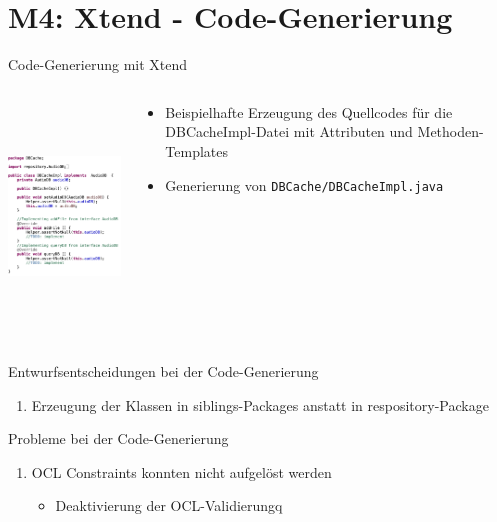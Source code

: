 \section[M4: Xtend]{M4: Xtend - Code-Generierung}
\begin{frame}{Code-Generierung mit Xtend}
	\vspace{-5mm}
	\begin{columns}
		\begin{contentblock}{}
			\includegraphics[height=60mm]{figures/xtend.png}
		\end{contentblock}
		\begin{contentblock}{}
			\begin{itemize}
				\item Beispielhafte Erzeugung des Quellcodes für die DBCacheImpl-Datei mit Attributen und Methoden-Templates
				\item Generierung von \texttt{DBCache/DBCacheImpl.java}
			\end{itemize}
		\end{contentblock}
	\end{columns}
\end{frame}

\begin{frame}{Entwurfsentscheidungen bei der Code-Generierung}
	\begin{enumerate}
		\item Erzeugung der Klassen in siblings-Packages anstatt in respository-Package 
	\end{enumerate}
\end{frame}

\begin{frame}{Probleme bei der Code-Generierung}
	\begin{enumerate}
			\item OCL Constraints konnten nicht aufgelöst werden
			\begin{itemize}
				\item Deaktivierung der OCL-Validierungq
			\end{itemize} 
	\end{enumerate}
\end{frame}